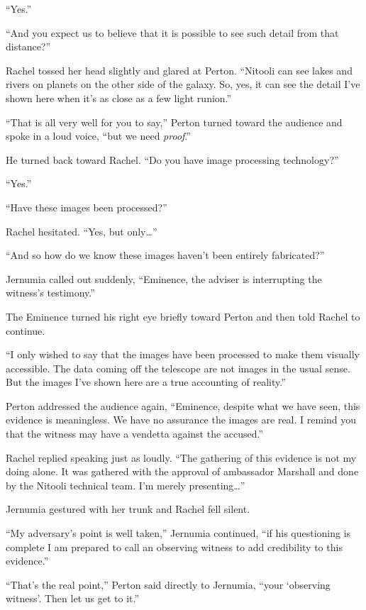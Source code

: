 ``Yes.''

``And you expect us to believe that it is possible to see such detail from that distance?''

Rachel tossed her head slightly and glared at Perton. ``Nitooli can see lakes and rivers on
planets on the other side of the galaxy. So, yes, it can see the detail I've shown here when
it's as close as a few light runion.''

``That is all very well for you to say,'' Perton turned toward the audience and spoke in a loud
voice, ``but we need \emph{proof}.''

He turned back toward Rachel. ``Do you have image processing technology?''

``Yes.''

``Have these images been processed?''

Rachel hesitated. ``Yes, but only\ldots''

``And so how do we know these images haven't been entirely fabricated?''

Jernumia called out suddenly, ``Eminence, the adviser is interrupting the witness's testimony.''

The Eminence turned his right eye briefly toward Perton and then told Rachel to continue.

``I only wished to say that the images have been processed to make them visually accessible. The
data coming off the telescope are not images in the usual sense. But the images I've shown here
are a true accounting of reality.''

Perton addressed the audience again, ``Eminence, despite what we have seen, this evidence is
meaningless. We have no assurance the images are real. I remind you that the witness may have a
vendetta against the accused.''


Rachel replied speaking just as loudly. ``The gathering of this evidence is not my doing alone.
It was gathered with the approval of ambassador Marshall and done by the Nitooli technical
team. I'm merely presenting\ldots''

Jernumia gestured with her trunk and Rachel fell silent.

``My adversary's point is well taken,'' Jernumia continued, ``if his questioning is complete I
am prepared to call an observing witness to add credibility to this evidence.''

``That's the real point,'' Perton said directly to Jernumia, ``your `observing witness'. Then
let us get to it.''

